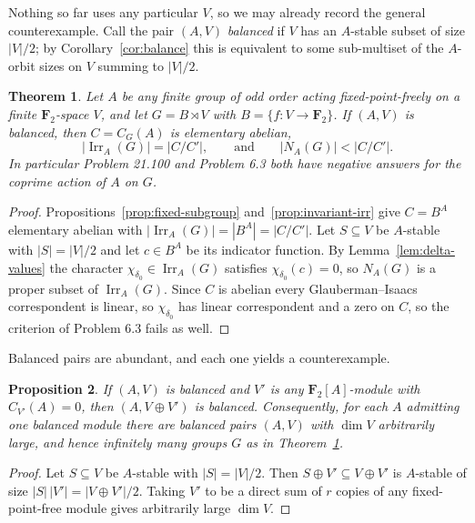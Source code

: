 \documentclass[11pt,a4paper,reqno]{amsart}
\newtheorem{theorem}{Theorem}[section]
\newtheorem{proposition}[theorem]{Proposition}
\theoremstyle{definition}
\theoremstyle{remark}
\newcommand{\F}{\mathbf F}
\newcommand{\Irr}{\operatorname{Irr}}
\begin{document}
Nothing so far uses any particular $V$, so we may already record the
general counterexample.  Call the pair $(A,V)$ \emph{balanced} if $V$
has an $A$-stable subset of size $|V|/2$; by
Corollary~\ref{cor:balance} this is equivalent to some sub-multiset of
the $A$-orbit sizes on $V$ summing to $|V|/2$.

\begin{theorem}\label{thm:general}
Let $A$ be any finite group of odd order acting fixed-point-freely on a
finite $\F_2$-space $V$, and let $G=B\rtimes V$ with
$B=\{f:V\to\F_2\}$.  If
$(A,V)$ is balanced, then $C=C_G(A)$ is elementary abelian,
\[
 |\Irr_A(G)|=|C/C'|,
 \qquad\text{and}\qquad
 |N_A(G)|<|C/C'| .
\]
In particular Problem 21.100 and Problem 6.3 both have negative
answers for the coprime action of $A$ on $G$.
\end{theorem}

\begin{proof}
Propositions~\ref{prop:fixed-subgroup} and~\ref{prop:invariant-irr} give
$C=B^A$ elementary abelian with $|\Irr_A(G)|=|B^A|=|C/C'|$.  Let
$S\subseteq V$ be $A$-stable with $|S|=|V|/2$ and let $c\in B^A$ be its
indicator function.  By Lemma~\ref{lem:delta-values} the character
$\chi_{\delta_0}\in\Irr_A(G)$ satisfies $\chi_{\delta_0}(c)=0$, so
$N_A(G)$ is a proper subset of $\Irr_A(G)$.  Since $C$ is abelian every
Glauberman--Isaacs correspondent is linear, so $\chi_{\delta_0}$ has
linear correspondent and a zero on $C$, so the criterion of Problem 6.3 fails as well.
\end{proof}

Balanced pairs are abundant, and each one yields a counterexample.

\begin{proposition}\label{prop:infinitely-many}
If $(A,V)$ is balanced and $V'$ is any $\F_2[A]$-module with
$C_{V'}(A)=0$, then $(A,V\oplus V')$ is balanced.  Consequently, for
each $A$ admitting one balanced module there are balanced pairs
$(A,V)$ with $\dim V$ arbitrarily large, and hence infinitely many
groups $G$ as in Theorem~\ref{thm:general}.
\end{proposition}

\begin{proof}
Let $S\subseteq V$ be $A$-stable with $|S|=|V|/2$.  Then
$S\oplus V'\subseteq V\oplus V'$ is $A$-stable of size
$|S|\,|V'|=|V\oplus V'|/2$.  Taking $V'$ to be a direct sum of $r$
copies of any fixed-point-free module gives arbitrarily large $\dim V$.
\end{proof}
\end{document}

